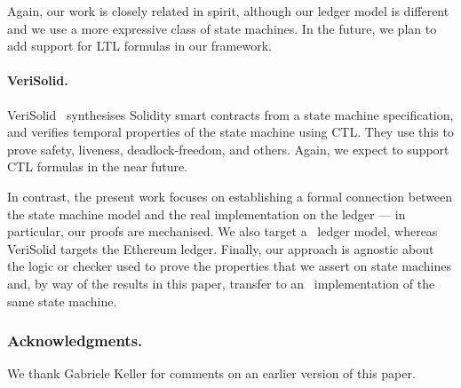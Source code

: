 Again, our work is closely related in spirit, although our ledger
model is different and we use a more expressive class of state
machines. In the future, we plan to add support for LTL formulas in our framework.

\paragraph{VeriSolid.}
%
VeriSolid~\cite{mavridou2019verisolid} synthesises Solidity smart
contracts from a state machine specification, and verifies temporal
properties of the state machine using CTL.
They use this to prove safety, liveness, deadlock-freedom, and others.
Again, we expect to support CTL formulas in the near future.

In contrast, the present work focuses on establishing a formal
connection between the state machine model and the real implementation
on the ledger --- in particular, our proofs are mechanised.
We also target a \UTXO\ ledger model, whereas VeriSolid targets the Ethereum ledger.
Finally, our approach is agnostic about the logic or checker used to
prove the properties that we assert on state machines and, by way of
the results in this paper, transfer to an \EUTXOma\ implementation of
the same state machine.

\subsubsection*{Acknowledgments.} We thank Gabriele Keller for comments on an earlier version of this paper.
